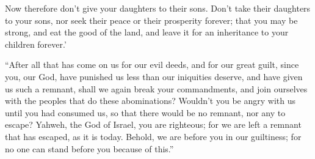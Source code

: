 {Now therefore don’t give your daughters to their sons. Don’t take their daughters to your sons, nor seek their peace or their prosperity forever; that you may be strong, and eat the good of the land, and leave it for an inheritance to your children forever.’
\par }{\PP {}“After all that has come on us for our evil deeds, and for our great guilt, since you, our God, have punished us less than our iniquities deserve, and have given us such a remnant,
shall we again break your commandments, and join ourselves with the peoples that do these abominations? Wouldn’t you be angry with us until you had consumed us, so that there would be no remnant, nor any to escape?
Yahweh, the God of Israel, you are righteous; for we are left a remnant that has escaped, as it is today. Behold, we are before you in our guiltiness; for no one can stand before you because of this.”

}

